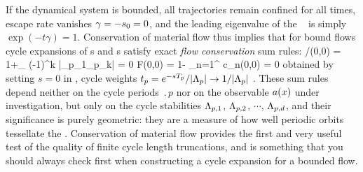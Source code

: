 \renewcommand{\inputfile}{\version\ - edited 2008-06-26 flowCons}



If the dynamical system is bounded, all trajectories remain confined for
all times, escape rate  vanishes $\gamma=-s_0=0$, and the
leading eigenvalue
of the \FPoper\  is simply
$\exp(-t\gamma)=1$.
Conservation of material flow thus implies that for bound flows
cycle expansions  of \dzeta s and \Fd s satisfy
exact {\em flow conservation} sum rules:
/\zeta(0,0) = 1+\sumprime_\pseudos
		{ (-1)^k \over
		|\ExpaEig_{p_1}\cdots \ExpaEig_{p_k}|} = 0
	\label{prob-cons-zeta}
\eeq
\beq
	F(0,0) = 1- \sum_{n=1}^{\infty} c_{n}(0,0) = 0
\label{prob-cons-F}
\eeq
obtained by setting $s=0$ in , 
cycle weights
$t_p  = e^{- s {T_{p}}} /|\Lambda_p|
\to {1 / |\ensuremath{\Lambda}_p|}$ .
These sum rules depend neither
on the cycle periods $\period{p}$
nor on the observable $a(x)$ under investigation,
but only on the cycle stabilities $\Lambda_{p,1}$, $\Lambda_{p,2}$,
$\cdots$, $\Lambda_{p,d}$,
and their significance is purely geometric: they are a measure
of how well periodic orbits tessellate the {\statesp}.
Conservation of material flow
provides the first and very useful test of the quality of
finite cycle length truncations, and is something that
you should always check first when constructing a cycle
expansion for a bounded flow. 
